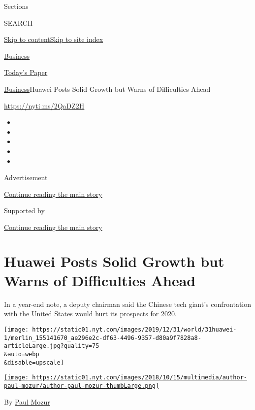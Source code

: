 Sections

SEARCH

\protect\hyperlink{site-content}{Skip to
content}\protect\hyperlink{site-index}{Skip to site index}

\href{https://www.nytimes.com/section/business}{Business}

\href{https://myaccount.nytimes.com/auth/login?response_type=cookie\&client_id=vi}{}

\href{https://www.nytimes.com/section/todayspaper}{Today's Paper}

\href{/section/business}{Business}\textbar{}Huawei Posts Solid Growth
but Warns of Difficulties Ahead

\url{https://nyti.ms/2QaDZ2H}

\begin{itemize}
\item
\item
\item
\item
\item
\end{itemize}

Advertisement

\protect\hyperlink{after-top}{Continue reading the main story}

Supported by

\protect\hyperlink{after-sponsor}{Continue reading the main story}

\hypertarget{huawei-posts-solid-growth-but-warns-of-difficulties-ahead}{%
\section{Huawei Posts Solid Growth but Warns of Difficulties
Ahead}\label{huawei-posts-solid-growth-but-warns-of-difficulties-ahead}}

In a year-end note, a deputy chairman said the Chinese tech giant's
confrontation with the United States would hurt its prospects for 2020.

\texttt{[image: https://static01.nyt.com/images/2019/12/31/world/31huawei-1/merlin\_155141670\_ae296e2c-df63-4496-9357-d80a9f7828a8-articleLarge.jpg?quality=75\\\&auto=webp\\\&disable=upscale]}

\href{https://www.nytimes.com/by/paul-mozur}{\texttt{[image: https://static01.nyt.com/images/2018/10/15/multimedia/author-paul-mozur/author-paul-mozur-thumbLarge.png]}}

By \href{https://www.nytimes.com/by/paul-mozur}{Paul Mozur}

